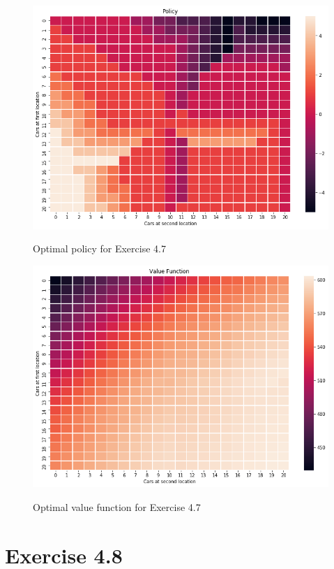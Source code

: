 \documentclass[a4paper,11pt]{article}
\numberwithin{equation}{section}
\theoremstyle{remark}
\begin{document}
\begin{figure}[h]
	\centering
	\caption{Optimal policy for Exercise 4.7}
	\includegraphics[scale=0.75]{policy_4_7.png}
	\label{fig:policy_4_7}
\end{figure}

\begin{figure}[h]
	\centering
	\caption{Optimal value function for Exercise 4.7}
	\includegraphics[scale=0.75]{value_function_4_7.png}
	\label{fig:value_function_4_7}
\end{figure}


\section{Exercise 4.8}
\end{document}

